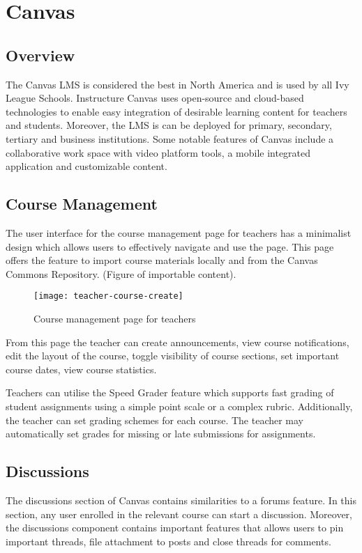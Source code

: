 \section{Canvas}

\subsection{Overview}
The Canvas LMS is considered the best in North America and is used by all Ivy League Schools. Instructure Canvas uses open-source and cloud-based technologies to enable easy integration of desirable learning content for teachers and students. Moreover, the LMS is can be deployed for primary, secondary, tertiary and business institutions. Some notable features of Canvas include a collaborative work space with video platform tools, a mobile integrated application and customizable content.

\subsection{Course Management}
The user interface for the course management page for teachers has a minimalist design which allows users to effectively navigate and use the page. This page offers the feature to import course materials locally and from the Canvas Commons Repository. (Figure of importable content). 

\begin{figure}[h!]
\texttt{[image: teacher-course-create]}
\centering
\caption{Course management page for teachers}
\end{figure}

From this page the teacher can create announcements, view course notifications, edit the layout of the course, toggle visibility of course sections, set important course dates, view course statistics.

Teachers can utilise the Speed Grader feature which supports fast grading of student assignments using a simple point scale or a complex rubric. Additionally, the teacher can set grading schemes for each course. The teacher may automatically set grades for missing or late submissions for assignments. 

\subsection{Discussions}
The discussions section of Canvas contains similarities to a forums feature. In this section, any user enrolled in the relevant course can start a discussion. Moreover, the discussions component contains important features that allows users to pin important threads, file attachment to posts and close threads for comments.

